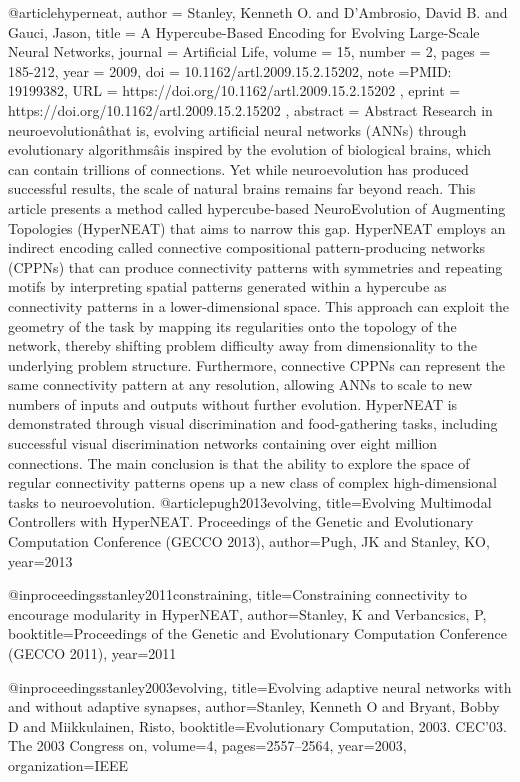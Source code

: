 @article{hyperneat,
  author = {Stanley, Kenneth O. and D'Ambrosio, David B. and Gauci, Jason},
  title = {A Hypercube-Based Encoding for Evolving Large-Scale Neural Networks},
  journal = {Artificial Life},
  volume = {15},
  number = {2},
  pages = {185-212},
  year = {2009},
  doi = {10.1162/artl.2009.15.2.15202},
  note ={PMID: 19199382},
  URL = { https://doi.org/10.1162/artl.2009.15.2.15202 },
  eprint = { https://doi.org/10.1162/artl.2009.15.2.15202 },
  abstract = { Abstract Research in neuroevolutionâthat is, evolving artificial neural networks (ANNs) through evolutionary algorithmsâis inspired by the evolution of biological brains, which can contain trillions of connections. Yet while neuroevolution has produced successful results, the scale of natural brains remains far beyond reach. This article presents a method called hypercube-based NeuroEvolution of Augmenting Topologies (HyperNEAT) that aims to narrow this gap. HyperNEAT employs an indirect encoding called connective compositional pattern-producing networks (CPPNs) that can produce connectivity patterns with symmetries and repeating motifs by interpreting spatial patterns generated within a hypercube as connectivity patterns in a lower-dimensional space. This approach can exploit the geometry of the task by mapping its regularities onto the topology of the network, thereby shifting problem difficulty away from dimensionality to the underlying problem structure. Furthermore, connective CPPNs can represent the same connectivity pattern at any resolution, allowing ANNs to scale to new numbers of inputs and outputs without further evolution. HyperNEAT is demonstrated through visual discrimination and food-gathering tasks, including successful visual discrimination networks containing over eight million connections. The main conclusion is that the ability to explore the space of regular connectivity patterns opens up a new class of complex high-dimensional tasks to neuroevolution. }
}
@article{pugh2013evolving,
  title={Evolving Multimodal Controllers with HyperNEAT. Proceedings of the Genetic and Evolutionary Computation Conference (GECCO 2013)},
  author={Pugh, JK and Stanley, KO},
  year={2013}
}

@inproceedings{stanley2011constraining,
  title={Constraining connectivity to encourage modularity in HyperNEAT},
  author={Stanley, K and Verbancsics, P},
  booktitle={Proceedings of the Genetic and Evolutionary Computation Conference (GECCO 2011)},
  year={2011}
}

@inproceedings{stanley2003evolving,
  title={Evolving adaptive neural networks with and without adaptive synapses},
  author={Stanley, Kenneth O and Bryant, Bobby D and Miikkulainen, Risto},
  booktitle={Evolutionary Computation, 2003. CEC'03. The 2003 Congress on},
  volume={4},
  pages={2557--2564},
  year={2003},
  organization={IEEE}
}

